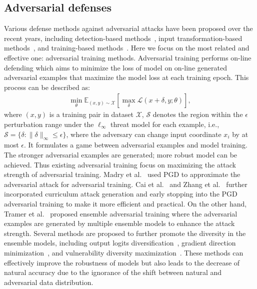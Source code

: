 \documentclass[10pt,twocolumn,letterpaper]{article}
\begin{document}
\subsection{Adversarial defenses}
Various defense methods against adversarial attacks have been proposed over the recent years, including detection-based methods~\cite{guo2017countering,buckman2018thermometer,63huang2019model}, input transformation-based methods~\cite{Liao2018denoise}, and training-based methods~\cite{Goodfellow2015,shafahi2019adversarial,wong2020fast,madry2018towards,tramer2017ensemble,zheng2020efficient,Zhang2020ES,Cai2018Curriculum}. Here we focus on the most related and effective one: adversarial training methods. Adversarial training performs on-line defending which aims to minimize the loss of model on on-line generated adversarial examples that maximize the model loss at each training epoch. This process can be described as:
	\begin{align}\label{eq1}
		\min _{\theta} \mathbb{E}_{(x, y) \sim \mathcal{X}}[\max _{\delta} \mathcal{L}(x+\delta, y; {\theta})],
	\end{align}
where $(x,y)$ is a training pair in dataset $\mathcal{X}$, $\mathcal{S}$ denotes the region within the $\epsilon$ perturbation range under the $\ell_{\infty}$ threat model for each example, i.e., $\mathcal{S}=\{\delta:\|\delta\|_{\infty} \leq \epsilon\}$, where the adversary can change input coordinate $x_{i}$ by at most $\epsilon$. It formulates a game between adversarial examples and model training. The stronger adversarial examples are generated; more robust model can be achieved. Thus existing adversarial training focus on maximizing the attack strength of adversarial training. Madry et al.~\cite{madry2018towards} used PGD to approximate the adversarial attack for adversarial training. Cai et al.~\cite{Cai2018Curriculum} and Zhang et al.~\cite{Zhang2020ES} further incorporated curriculum attack generation and early stopping into the PGD adversarial training to make it more efficient and practical. On the other hand, Tramer et al.~\cite{tramer2017ensemble} proposed ensemble adversarial training where the adversarial examples are generated by multiple ensemble models to enhance the attack strength. Several methods are proposed to further promote the diversity in the ensemble models, including output logits diversification~\cite{pang2019improving}, gradient direction minimization~\cite{kariyappa2019improving}, and vulnerability diversity maximization~\cite{yang2020dverge}. These methods can effectively improve the robustness of models but also leads to the decrease of natural accuracy due to the ignorance of the shift between natural and adversarial data distribution.
\end{document}
